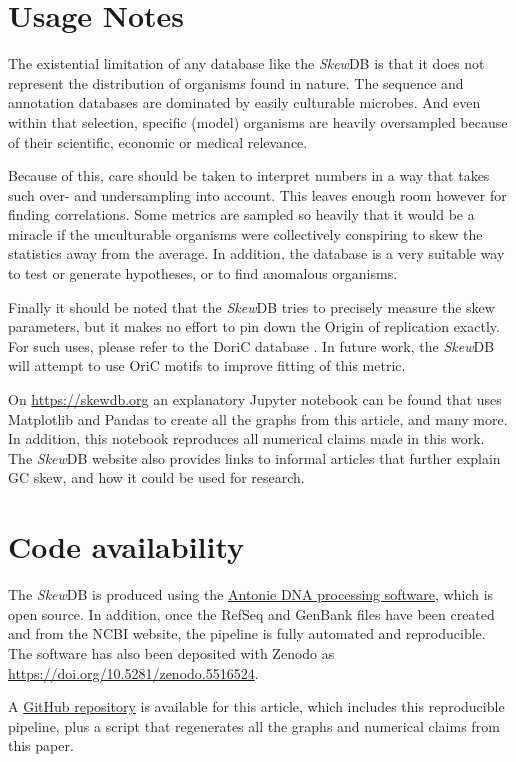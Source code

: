 \documentclass[fleqn,10pt]{wlscirep}
\begin{document}
\section*{Usage Notes}
The existential limitation of any database like the \emph{Skew}DB is that it does not represent the distribution of organisms found in nature. The sequence and annotation databases are dominated by easily culturable microbes. And even within that selection, specific (model) organisms are heavily oversampled because of their scientific, economic or medical relevance.

Because of this, care should be taken to interpret numbers in a way that takes such over- and undersampling into account. This leaves enough room however for finding correlations. Some metrics are sampled so heavily that it would be a miracle if the unculturable organisms were collectively conspiring to skew the statistics away from the average. In addition, the database is a very suitable way to test or generate hypotheses, or to find anomalous organisms.

Finally it should be noted that the \emph{Skew}DB tries to precisely measure the skew parameters, but it makes no effort to pin down the Origin of replication exactly. For such uses, please refer to the DoriC database \cite{luo_doric_2019}. In future work, the \emph{Skew}DB will attempt to use OriC motifs to improve fitting of this metric.

On \url{https://skewdb.org} an explanatory Jupyter \cite{Kluyver:2016aa} notebook can be found that uses Matplotlib \cite{Hunter:2007} and Pandas \cite{jeff_reback_2021_5203279} to create all the graphs from this article, and many more. In addition, this notebook reproduces all numerical claims made in this work. The \emph{Skew}DB website also provides links to informal articles that further explain GC skew, and how it could be used for research.


\section*{Code availability}
The \emph{Skew}DB is produced using the \href{https://github.eu/berthubert/antonie2}{Antonie DNA processing software}, which is open source. In addition, once the RefSeq and GenBank files have been created and from the NCBI website, the pipeline is fully automated and reproducible. The software has also been deposited with Zenodo as \url{https://doi.org/10.5281/zenodo.5516524}.

A \href{https://github.com/berthubert/skewdb-articles}{GitHub repository} is available for this article, which includes this reproducible pipeline, plus a script that regenerates all the graphs and numerical claims from this paper. 
\end{document}

